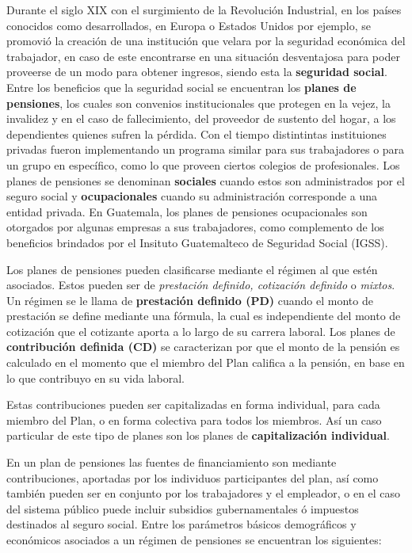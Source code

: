 \documentclass[12pt,letterpaper,titlepage]{article}
\begin{document}
Durante el siglo XIX con el surgimiento de la Revolución Industrial, en los países conocidos como desarrollados, en Europa o Estados Unidos por ejemplo,  se promovió la creación de una institución que velara por la seguridad económica del trabajador, en caso de este encontrarse en una situación desventajosa para poder proveerse de un modo para obtener ingresos, siendo esta la \textbf{seguridad social}. Entre los beneficios que la seguridad social se encuentran los \textbf{planes de pensiones}, los cuales son convenios institucionales que protegen en la vejez, la invalidez y en el caso de fallecimiento, del proveedor de sustento del hogar, a los dependientes quienes sufren la pérdida. Con el tiempo distintintas instituiones privadas fueron implementando un programa similar para sus trabajadores o para un grupo en específico, como lo que proveen ciertos colegios de profesionales. Los planes de pensiones se denominan \textbf{sociales} cuando estos son administrados por el seguro social y \textbf{ocupacionales} cuando su administración corresponde a una entidad privada.  En Guatemala, los planes de pensiones ocupacionales son otorgados por algunas empresas a sus trabajadores, como complemento de los beneficios brindados por el Insituto Guatemalteco de Seguridad Social (IGSS). 

Los planes de pensiones pueden clasificarse mediante el régimen al que estén asociados. Estos pueden ser de \textit{prestación definido,  cotización definido} o \textit{mixtos}. Un régimen se le llama de \textbf{prestación definido (PD)} cuando el monto de prestación se define mediante una fórmula, la cual es independiente del monto de cotización que el cotizante aporta a lo largo de su carrera laboral. Los planes de \textbf{contribución definida (CD)} se caracterizan por que el monto de la pensión es calculado en el momento que el miembro del Plan califica a la pensión, en base en lo que contribuyo en su vida laboral. 

Estas contribuciones pueden ser capitalizadas en forma individual, para  cada miembro del Plan, o en forma colectiva para todos los miembros. Así un caso particular de este tipo de planes son los planes de \textbf{capitalización individual}.

En un plan de pensiones las fuentes de financiamiento son mediante contribuciones, aportadas por los individuos participantes del plan, así como también pueden ser en conjunto por los trabajadores y el empleador, o en el caso del sistema público puede incluir subsidios gubernamentales ó impuestos destinados al seguro social. Entre los parámetros básicos demográficos y económicos asociados a un régimen de pensiones se encuentran los siguientes:
 
\end{document}
